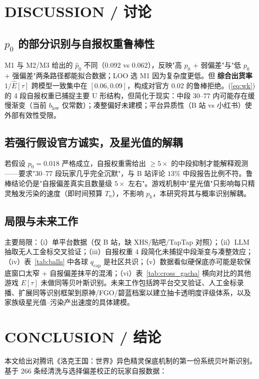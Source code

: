 \documentclass[journal]{IEEEtran}
\begin{document}
\section{DISCUSSION / 讨论}

\subsection{$p_0$ 的部分识别与自报权重鲁棒性}

M1 与 M2/M3 给出的 $\hat p_0$ 不同（$0.092$ vs $0.062$），反映"高 $p_0$ + 弱偏差"与"低 $p_0$ + 强偏差"两条路径都能拟合数据；LOO 选 M1 因为复杂度更低。但 \textbf{综合出货率} $1/\hat E[\tau]$ 跨模型一致集中在 $[0.06, 0.09]$，构成对官方 $0.02$ 的鲁棒拒绝。(\ref{eq:wk}) 的 4 段自报权重已捕捉主要 U 形结构，但简化于现实：中段 $30$--$77$ 内可能存在缓慢渐变（当前 $b_{\text{low}}$ 仅常数）；凑整偏好未建模；平台异质性（B 站 vs 小红书）使外部有效性受限。

\subsection{若强行假设官方诚实，及星光值的解耦}

若假设 $p_0 = 0.018$ 严格成立，自报权重需给出 $\ge 5\times$ 的中段抑制才能解释观测——要求"$30$--$77$ 段玩家几乎完全沉默"，与 B 站评论 $13\%$ 中段报告比例不符。鲁棒结论仍是"自报偏差真实且数量级 $5\times$ 左右"。游戏机制中"星光值"只影响每只精灵触发污染的速度（即时间预算 $T_n$），不影响 $p_k$，本研究将其与概率识别解耦。

\subsection{局限与未来工作}

主要局限：（i）单平台数据（仅 B 站，缺 XHS/贴吧/TapTap 对照）；（ii）LLM 抽取无人工金标交叉验证；（iii）自报权重 4 段简化未捕捉中段渐变与凑整效应；（iv）表~\ref{tab:balls} 中各球 $q_{\text{cap}}$ 是社区共识；（v）数据看似硬保底亦可能是软保底窗口太窄 + 自报偏差抹平的混淆；（vi）表~\ref{tab:cross_gacha} 横向对比的其他游戏 $E[\tau]$ 未做同等贝叶斯识别。未来工作包括跨平台交叉验证、人工金标录播、扩展同等识别框架到原神/FGO/碧蓝档案以建立抽卡透明度评级体系，以及家族级星光值--污染产出速度的具体建模。


\section{CONCLUSION / 结论}

本文给出对腾讯《洛克王国：世界》异色精灵保底机制的第一份系统贝叶斯识别。基于 $266$ 条经清洗与选择偏差校正的玩家自报数据：
\end{document}
